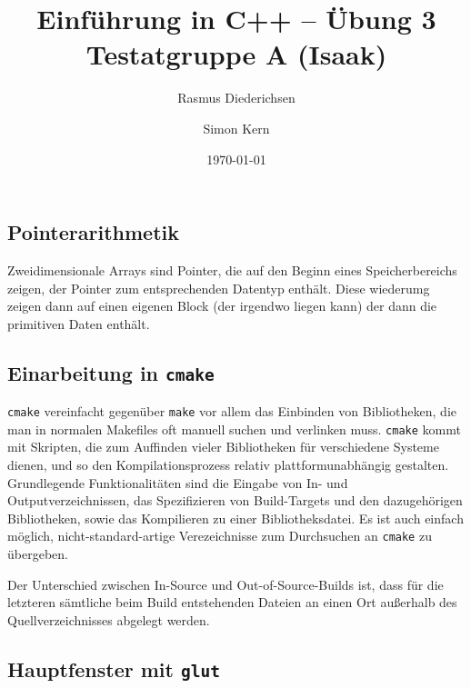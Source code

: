 \documentclass{article}
\title{Einführung in C++ -- Übung 3 \\ Testatgruppe A (Isaak)}
\author{Rasmus Diederichsen \and Simon Kern}
\date{\today}
\begin{document}
   \maketitle

   \section{}
   \setcounter{section}{3}

   \subsection{Pointerarithmetik}
   

   Zweidimensionale Arrays sind Pointer, die auf den Beginn eines
   Speicherbereichs zeigen, der Pointer zum entsprechenden Datentyp enthält.
   Diese wiederumg zeigen dann auf einen eigenen Block (der irgendwo liegen
   kann) der dann die primitiven Daten enthält.
   
   \subsection{Einarbeitung in \texttt{cmake}}
   
   \texttt{cmake} vereinfacht gegenüber \texttt{make} vor allem das Einbinden
   von Bibliotheken, die man in normalen Makefiles oft manuell suchen und
   verlinken muss. \texttt{cmake} kommt mit Skripten, die zum Auffinden vieler
   Bibliotheken für verschiedene Systeme dienen, und so den Kompilationsprozess
   relativ plattformunabhängig gestalten. Grundlegende Funktionalitäten sind die
   Eingabe von In- und Outputverzeichnissen, das Spezifizieren von Build-Targets
   und den dazugehörigen Bibliotheken, sowie das Kompilieren zu einer
   Bibliotheksdatei. Es ist auch einfach möglich, nicht-standard-artige
   Verezeichnisse zum Durchsuchen an \texttt{cmake} zu übergeben.

   Der Unterschied zwischen In-Source und Out-of-Source-Builds ist, dass für die
   letzteren sämtliche beim Build entstehenden Dateien an einen Ort außerhalb
   des Quellverzeichnisses abgelegt werden.

   \subsection{Hauptfenster mit \texttt{glut}}
   
   
   
   
   
   
   
\end{document}
